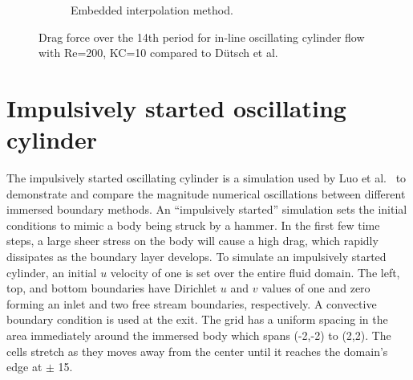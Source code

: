 \begin{figure}[!htb]
\begin{subfigure}{0.4\textwidth}
		\caption{Embedded interpolation method.}
	\end{subfigure}
	\caption{Drag force over the 14th period for in-line oscillating cylinder flow with Re=200, KC=10 compared to D\"{u}tsch et al.~\cite{dutsch1998low}}
	\label{fig:KC 10}
\end{figure}

\section{Impulsively started oscillating cylinder}
\label{sec:osccylinder}
The impulsively started oscillating cylinder is a simulation used by Luo et al.~\cite{Luo:2012gx} to demonstrate and compare the magnitude numerical oscillations between different immersed boundary methods. 
An ``impulsively started'' simulation sets the initial conditions to mimic a body being struck by a hammer. 
In the first few time steps, a large sheer stress on the body will cause a high drag, which rapidly dissipates as the boundary layer develops. 
To simulate an impulsively started cylinder, an initial $u$ velocity of one is set over the entire fluid domain. 
The left, top, and bottom boundaries have Dirichlet $u$ and $v$ values of one and zero forming an inlet and two free stream boundaries, respectively. 
A convective boundary condition is used at the exit. 
The grid has a uniform spacing in the area immediately around the immersed body which spans (-2,-2) to (2,2). 
The cells stretch as they moves away from the center until it reaches the domain's edge at $\pm$ 15. 

